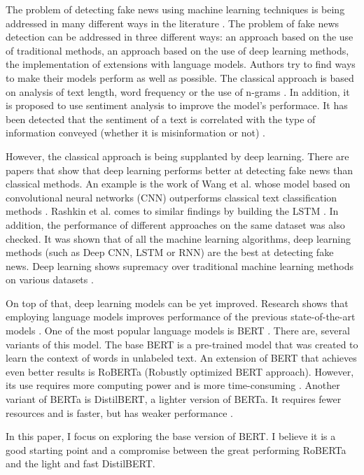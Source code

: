 The problem of detecting fake news using machine learning techniques is being addressed in many different ways in the literature \autocite{Pathak2020}. The problem of fake news detection can be addressed in three different ways: an approach based on the use of traditional methods, an approach based on the use of deep learning methods, the implementation of extensions with language models. Authors try to find ways to make their models perform as well as possible. The classical approach is based on analysis of text length, word frequency or the use of n-grams \autocite{Shu2017}. In addition, it is proposed to use sentiment analysis to improve the model's performace. It has been detected that the sentiment of a text is correlated with the type of information conveyed (whether it is misinformation or not) \autocite{rubin2016fake}.

However, the classical approach is being supplanted by deep learning. There are papers that show that deep learning performs better at detecting fake news than classical methods. An example is the work of Wang et al. whose model based on convolutional neural networks (CNN) outperforms classical text classification methods \autocite{wang-2017-liar}. Rashkin et al. comes to similar findings by building the LSTM \autocite{rashkin-etal-2017-truth}. In addition, the performance of different approaches on the same dataset was also checked. It was shown that of all the machine learning algorithms, deep learning methods (such as Deep CNN, LSTM or RNN) are the best at detecting fake news. Deep learning shows supremacy over traditional machine learning methods on various datasets \autocite{IEEE2021}. 

On top of that, deep learning models can be yet improved. Research shows that employing language models improves performance of the previous state-of-the-art models \autocite{Conroy2015}. One of the most popular language models is BERT \autocite{Devlin2018}. There are, several variants of this model. The base BERT is a pre-trained model that was created to learn the context of words in unlabeled text. An extension of BERT that achieves even better results is RoBERTa (Robustly optimized BERT approach). However, its use requires more computing power and is more time-consuming \autocite{Liu2019}. Another variant of BERTa is DistilBERT, a lighter version of BERTa. It requires fewer resources and is faster, but has weaker performance \autocite{Sanh2019}.

In this paper, I focus on exploring the base version of BERT. I believe it is a good starting point and a compromise between the great performing RoBERTa and the light and fast DistilBERT. 

